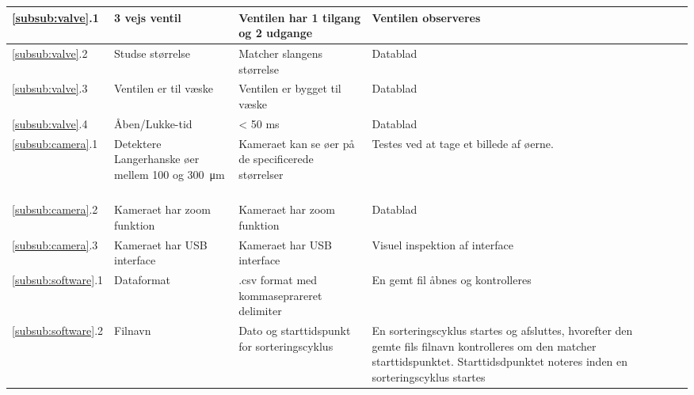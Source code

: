 \begin{center}
\begin{longtable}{ | m{1.785cm} | m{1.785cm}| m{1.785cm}| m{1.785cm}| m{1.785cm}| m{1.785cm}|m{1.785cm}| }
\ref{subsub:valve}.1 
			& 
3 vejs ventil
   & 
Ventilen har 1 tilgang og 2 udgange
    &
     Ventilen observeres
    &  & & \\
			\hline
			
			\ref{subsub:valve}.2 
			& 
Studse størrelse
   & 
Matcher slangens størrelse
    &
     Datablad
    &  & & \\
			\hline
		
				\ref{subsub:valve}.3
			& 
Ventilen er til væske
   & 
Ventilen er bygget til væske
    &
     Datablad
    &  & & \\
			\hline	
			
						\ref{subsub:valve}.4
			& 
Åben/Lukke-tid
   & 
< 50 ms
    &
     Datablad
    &  & & \\
			\hline	
			
			\hline	
			
						\ref{subsub:camera}.1
			& 
Detektere Langerhanske øer mellem 100 og  \SI{300}{\micro\metre}  \
   & 
Kameraet kan se øer på de specificerede størrelser
    &
     Testes ved at tage et billede af øerne. 
    &  & & \\
			\hline	
			
			\hline	
			
						\ref{subsub:camera}.2
			& 
Kameraet har zoom funktion \
   & 
Kameraet har zoom funktion
    &
     Datablad 
    &  & & \\
			\hline	
			
			\hline	
			
						\ref{subsub:camera}.3
			& 
Kameraet har USB interface \
   & 
Kameraet har USB interface
    &
     Visuel inspektion af interface 
    &  & & \\
			\hline	
			
			\hline	
			
						\ref{subsub:software}.1
			& 
Dataformat \
   & 
.csv format med kommaseprareret delimiter
    &
     En gemt fil åbnes og kontrolleres
    &  & & \\
			\hline
			
			\hline	
			
						\ref{subsub:software}.2
			& 
Filnavn \
   & 
Dato og starttidspunkt for sorteringscyklus
    &
     En sorteringscyklus startes og afsluttes, hvorefter den gemte fils filnavn kontrolleres om den matcher starttidspunktet. Starttidsdpunktet noteres inden en sorteringscyklus startes
    &  & & \\
			\hline	
				
				\hline	
			

\end{longtable}
\end{center}

